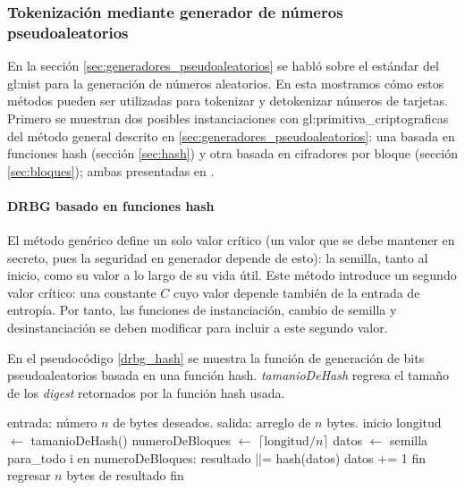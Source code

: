 %
%
%

\subsubsection{Tokenización mediante generador de números pseudoaleatorios}

En la sección \ref{sec:generadores_pseudoaleatorios} se habló sobre el
estándar del \gls{gl:nist} para la generación de números aleatorios. En esta
mostramos cómo estos métodos pueden ser utilizadas para tokenizar y detokenizar
números de tarjetas. Primero se muestran dos posibles instanciaciones
con \glspl{gl:primitiva_criptografica} del método general descrito en
\ref{sec:generadores_pseudoaleatorios}: una basada en funciones hash
(sección \ref{sec:hash}) y otra basada en cifradores por bloque (sección
\ref{sec:bloques}); ambas presentadas en \cite{nist_aleatorios}.

\paragraph{DRBG basado en funciones hash}

El método genérico define un solo valor crítico (un valor que se debe mantener
en secreto, pues la seguridad en generador depende de esto): la semilla, tanto
al inicio, como su valor a lo largo de su vida útil. Este método introduce
un segundo valor crítico: una constante $ C $ cuyo valor depende también de
la entrada de entropía. Por tanto, las funciones de instanciación,
cambio de semilla y desinstanciación se deben modificar para incluir
a este segundo valor.

En el pseudocódigo \ref{drbg_hash} se muestra la función de generación de bits
pseudoaleatorios basada en una función hash. \textit{tamanioDeHash} regresa el
tamaño de los \textit{digest} retornados por la función hash usada.

\begin{pseudocodigo}[%
    caption={Generación de bits pseudoaleatorios mediante función hash},
    label={drbg_hash}%
  ]
    entrada: número $ n $ de bytes deseados.
    salida:  arreglo de $ n $ bytes.
    inicio
      longitud $ \gets $ tamanioDeHash()
      numeroDeBloques $ \gets $ $ \lceil \text{longitud} / n \rceil $
      datos $ \gets $ semilla
      para_todo i en numeroDeBloques:
        resultado ||= hash(datos)
        datos += 1
      fin
      regresar $ n $ bytes de resultado
    fin
\end{pseudocodigo}

